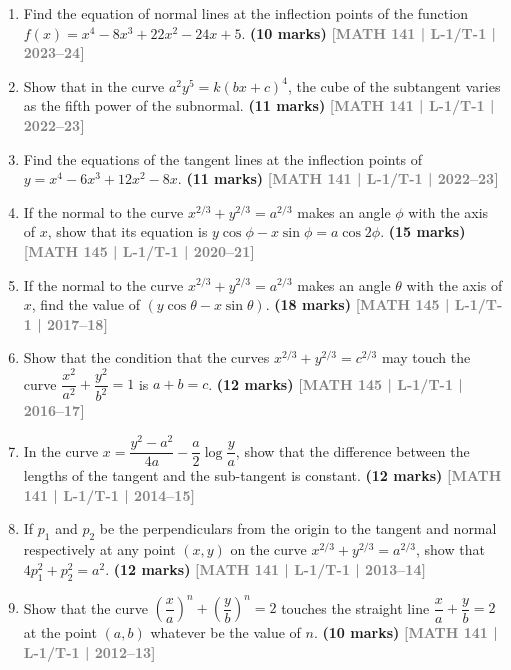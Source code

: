 \documentclass[12pt,a4paper]{article}
\newcommand{\yr}[1]{\hfill\textcolor{gray}{\small\textbf{[#1]}}}
\newcommand{\mk}[1]{\textcolor{orange!70!black}{\small\textbf{(#1 marks)}}}
\begin{document}
\begin{enumerate}\item Find the equation of normal lines at the inflection points of the function $f(x)=x^{4}-8x^{3}+22x^{2}-24x+5$.
\mk{10} \yr{MATH 141 | L-1/T-1 | 2023--24}

\item Show that in the curve $a^{2}y^{5}=k(bx+c)^{4}$, the cube of the subtangent varies as the fifth power of the subnormal.
\mk{11} \yr{MATH 141 | L-1/T-1 | 2022--23}

\item Find the equations of the tangent lines at the inflection points of $y=x^{4}-6x^{3}+12x^{2}-8x$.
\mk{11} \yr{MATH 141 | L-1/T-1 | 2022--23}



\item If the normal to the curve $x^{2/3}+y^{2/3}=a^{2/3}$ makes an angle $\phi$ with the axis of $x$, show that its equation is $y\cos\phi-x\sin\phi=a\cos 2\phi$.
\mk{15} \yr{MATH 145 | L-1/T-1 | 2020--21}

\item If the normal to the curve $x^{2/3}+y^{2/3}=a^{2/3}$ makes an angle $\theta$ with the axis of $x$, find the value of $(y\cos\theta-x\sin\theta)$.
\mk{18} \yr{MATH 145 | L-1/T-1 | 2017--18}

\item Show that the condition that the curves $x^{2/3}+y^{2/3}=c^{2/3}$ may touch the curve $\dfrac{x^{2}}{a^{2}}+\dfrac{y^{2}}{b^{2}}=1$ is $a+b=c$.
\mk{12} \yr{MATH 145 | L-1/T-1 | 2016--17}

\item In the curve $x=\dfrac{y^{2}-a^{2}}{4a}-\dfrac{a}{2}\log\dfrac{y}{a}$, show that the difference between the lengths of the tangent and the sub-tangent is constant.
\mk{12} \yr{MATH 141 | L-1/T-1 | 2014--15}

\item If $p_{1}$ and $p_{2}$ be the perpendiculars from the origin to the tangent and normal respectively at any point $(x,y)$ on the curve $x^{2/3}+y^{2/3}=a^{2/3}$, show that $4p_{1}^{2}+p_{2}^{2}=a^{2}$.
\mk{12} \yr{MATH 141 | L-1/T-1 | 2013--14}

\item Show that the curve $\left(\dfrac{x}{a}\right)^{n}+\left(\dfrac{y}{b}\right)^{n}=2$ touches the straight line $\dfrac{x}{a}+\dfrac{y}{b}=2$ at the point $(a,b)$ whatever be the value of $n$.
\mk{10} \yr{MATH 141 | L-1/T-1 | 2012--13}


\end{enumerate}
\end{document}
